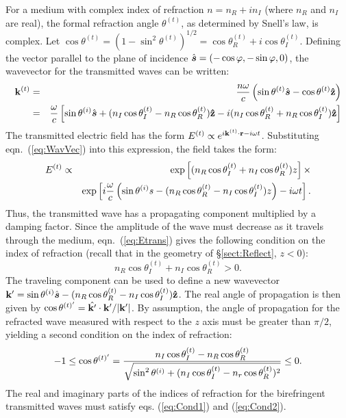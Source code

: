 \documentclass{emulateapj}
\newcommand{\be}{\begin{equation}}
\newcommand{\ee}{\end{equation}}
\newcommand{\bk}{{\bf k}}
\newcommand{\hatz}{{\bf\hat z}}
\newcommand{\sni}{\sin\theta^{(i)} }
\newcommand{\snis}{\sin^2\theta^{(i)} }
\newcommand{\snp}{\sin\varphi }
\newcommand{\cnp}{\cos\varphi }
\newcommand{\sn}{\sin\theta^{(t)}}
\newcommand{\cn}{\cos\theta^{(t)}}
\newcommand{\cnre}{\cos\theta^{(t)}_R}
\newcommand{\cnim}{\cos\theta^{(t)}_I}
\newcommand{\bfs}{{\mbox{\boldmath $s$}}}
\begin{document}
For a medium with complex index of refraction $n=n_R+i n_I$ (where $n_R$ and $n_I$ are real), the formal 
refraction angle $\theta^{(t)}$, as determined by Snell's law, is complex.
Let $\cn=(1-\sin^2\theta^{(t)})^{1/2}=\cnre+i\cnim$.  Defining 
the vector parallel to the plane of incidence $\hat\bfs=(-\cnp,-\snp,0)$, 
the wavevector for the transmitted waves can be written:
\begin{eqnarray}
\label{eq:WavVec}
\bk^{(t)} & = & {n\omega\over c}\left(\sn\hat\bfs-\cn\hatz\right) \nonumber\\
& = & {\omega\over c}\left[\sni\hat\bfs+(n_I\cnim-n_R\cnre)\hatz-i(n_I\cnre+n_R\cnim)\hatz\right]
\end{eqnarray}
The transmitted electric field has the form $E^{(t)}\propto e^{i\bk^{(t)}\cdot{\bf r}-i\omega t}$.  
Substituting eqn.~(\ref{eq:WavVec}) into this expression, the field takes the form:
\begin{eqnarray}
\label{eq:Etrans}
E^{(t)} & \propto & \exp\left[(n_R\cnim+n_I\cnre)z\right]\times\nonumber\\
& & \exp\left[i{\omega\over c}\left(\sni s-(n_R\cnre-n_I\cnim)z\right)-i\omega t\right].
\end{eqnarray}
Thus, the transmitted wave has a propagating component multiplied by a damping factor.  Since the amplitude 
of the wave must decrease as it travels through the medium, eqn.~(\ref{eq:Etrans}) gives the following 
condition on the index of refraction (recall that in the geometry of \S\ref{sect:Reflect}, $z<0$):
\be
\label{eq:Cond1}
n_R\cnim+n_I\cnre>0.
\ee
The traveling component can be used to define a new wavevector 
$\bk' = \sni\hat\bfs - (n_R\cnre-n_I\cnim)\hatz$.
The real angle of propagation is then given by 
$\cos\theta^{(t)'}=\hat{\bk'}\cdot\bk'/|\bk'|$.
By assumption, the angle of propagation for the refracted 
wave measured with respect to the $z$ axis must be greater 
than $\pi/2$, yielding a second condition on the index of refraction:
\be
\label{eq:Cond2}
-1\le
\cos\theta^{(t)'}=
{{n_I\cnim-n_R\cnre}\over {\sqrt{\snis+(n_I\cnim-n_r\cnre)^2}}}\le 0.
\ee
The real and imaginary parts of the indices of refraction for the birefringent transmitted waves must 
satisfy eqs. (\ref{eq:Cond1}) and (\ref{eq:Cond2}).

\end{document}
